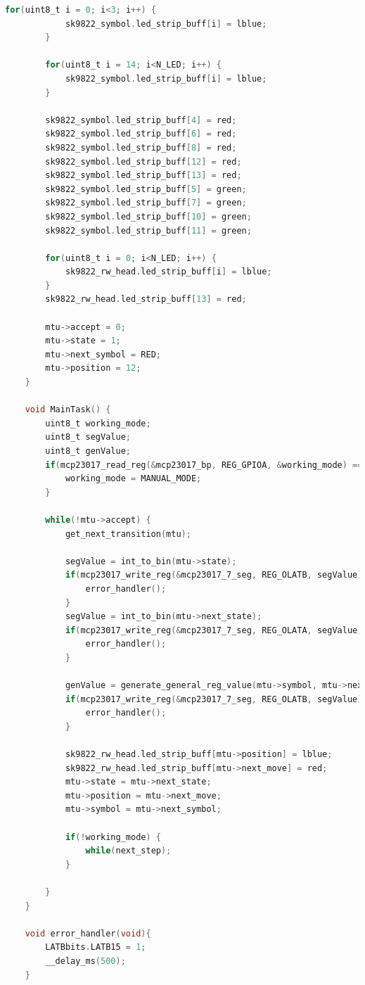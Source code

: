 \documentclass[12pt]{report}
\begin{document}
\begin{lstlisting}[language=C]
		for(uint8_t i = 0; i<3; i++) {
			sk9822_symbol.led_strip_buff[i] = lblue;
		}
		
		for(uint8_t i = 14; i<N_LED; i++) {
			sk9822_symbol.led_strip_buff[i] = lblue;
		}
		
		sk9822_symbol.led_strip_buff[4] = red;
		sk9822_symbol.led_strip_buff[6] = red;
		sk9822_symbol.led_strip_buff[8] = red;
		sk9822_symbol.led_strip_buff[12] = red;
		sk9822_symbol.led_strip_buff[13] = red;
		sk9822_symbol.led_strip_buff[5] = green;
		sk9822_symbol.led_strip_buff[7] = green;
		sk9822_symbol.led_strip_buff[10] = green;
		sk9822_symbol.led_strip_buff[11] = green;
		
		for(uint8_t i = 0; i<N_LED; i++) {
			sk9822_rw_head.led_strip_buff[i] = lblue;
		}
		sk9822_rw_head.led_strip_buff[13] = red;
		
		mtu->accept = 0;
		mtu->state = 1;
		mtu->next_symbol = RED;
		mtu->position = 12;
	}
	
	void MainTask() {
		uint8_t working_mode;
		uint8_t segValue;
		uint8_t genValue;
		if(mcp23017_read_reg(&mcp23017_bp, REG_GPIOA, &working_mode) == MCP23017_ERROR) {
			working_mode = MANUAL_MODE;
		}
		
		while(!mtu->accept) {
			get_next_transition(mtu);
			
			segValue = int_to_bin(mtu->state);
			if(mcp23017_write_reg(&mcp23017_7_seg, REG_OLATB, segValue) == MCP23017_ERROR) {
				error_handler();
			}
			segValue = int_to_bin(mtu->next_state);
			if(mcp23017_write_reg(&mcp23017_7_seg, REG_OLATA, segValue) == MCP23017_ERROR) {
				error_handler();
			}
			
			genValue = generate_general_reg_value(mtu->symbol, mtu->next_symbol, mtu->next_move);
			if(mcp23017_write_reg(&mcp23017_7_seg, REG_OLATB, segValue) == MCP23017_ERROR) {
				error_handler();
			}
			
			sk9822_rw_head.led_strip_buff[mtu->position] = lblue;
			sk9822_rw_head.led_strip_buff[mtu->next_move] = red;
			mtu->state = mtu->next_state;
			mtu->position = mtu->next_move;
			mtu->symbol = mtu->next_symbol;
			
			if(!working_mode) {
				while(next_step);
			}
			
		}
	}
	
	void error_handler(void){
		LATBbits.LATB15 = 1;
		__delay_ms(500);
	}
	\end{lstlisting}
\end{document}
